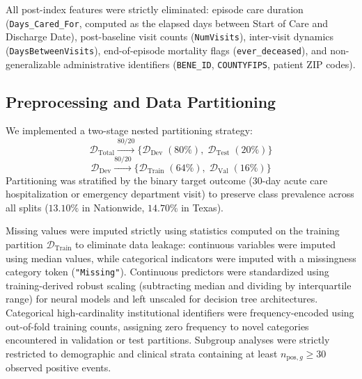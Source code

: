 \documentclass[10pt,journal]{IEEEtran}
\begin{document}
All post-index features were strictly eliminated: episode care duration (\texttt{Days\_Cared\_For}, computed as the elapsed days between Start of Care and Discharge Date), post-baseline visit counts (\texttt{NumVisits}), inter-visit dynamics (\texttt{DaysBetweenVisits}), end-of-episode mortality flags (\texttt{ever\_deceased}), and non-generalizable administrative identifiers (\texttt{BENE\_ID}, \texttt{COUNTYFIPS}, patient ZIP codes).

\subsection{Preprocessing and Data Partitioning}
We implemented a two-stage nested partitioning strategy:
$$\mathcal{D}_{\text{Total}} \xrightarrow{80/20} \{\mathcal{D}_{\text{Dev}} \; (80\%), \; \mathcal{D}_{\text{Test}} \; (20\%)\}$$
$$\mathcal{D}_{\text{Dev}} \xrightarrow{80/20} \{\mathcal{D}_{\text{Train}} \; (64\%), \; \mathcal{D}_{\text{Val}} \; (16\%)\}$$
Partitioning was stratified by the binary target outcome (30-day acute care hospitalization or emergency department visit) to preserve class prevalence across all splits ($13.10\%$ in Nationwide, $14.70\%$ in Texas). 

Missing values were imputed strictly using statistics computed on the training partition $\mathcal{D}_{\text{Train}}$ to eliminate data leakage: continuous variables were imputed using median values, while categorical indicators were imputed with a missingness category token (\texttt{"Missing"}). Continuous predictors were standardized using training-derived robust scaling (subtracting median and dividing by interquartile range) for neural models and left unscaled for decision tree architectures. Categorical high-cardinality institutional identifiers were frequency-encoded using out-of-fold training counts, assigning zero frequency to novel categories encountered in validation or test partitions. Subgroup analyses were strictly restricted to demographic and clinical strata containing at least $n_{\text{pos}, g} \ge 30$ observed positive events.
\end{document}
